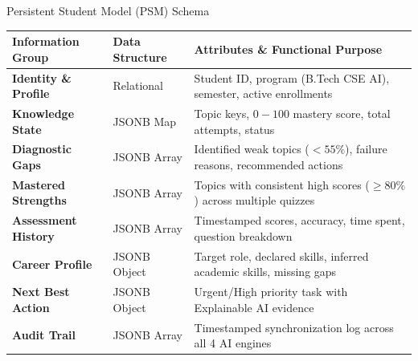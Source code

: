 \documentclass[aspectratio=169,10pt]{beamer}
\begin{document}
\begin{frame}{Persistent Student Model (PSM) Schema}
  \begin{table}[]
    \centering
    \small
    \begin{tabular}{llp{7.5cm}}
      \toprule
      \textbf{Information Group} & \textbf{Data Structure} & \textbf{Attributes \& Functional Purpose} \\
      \midrule
      \textbf{Identity \& Profile} & Relational & Student ID, program (B.Tech CSE AI), semester, active enrollments \\
      \textbf{Knowledge State} & JSONB Map & Topic keys, $0-100$ mastery score, total attempts, status \\
      \textbf{Diagnostic Gaps} & JSONB Array & Identified weak topics ($<55\%$), failure reasons, recommended actions \\
      \textbf{Mastered Strengths} & JSONB Array & Topics with consistent high scores ($\ge 80\%$) across multiple quizzes \\
      \textbf{Assessment History} & JSONB Array & Timestamped scores, accuracy, time spent, question breakdown \\
      \textbf{Career Profile} & JSONB Object & Target role, declared skills, inferred academic skills, missing gaps \\
      \textbf{Next Best Action} & JSONB Object & Urgent/High priority task with Explainable AI evidence \\
      \textbf{Audit Trail} & JSONB Array & Timestamped synchronization log across all 4 AI engines \\
      \bottomrule
    \end{tabular}
  \end{table}
\end{frame}
\end{document}
